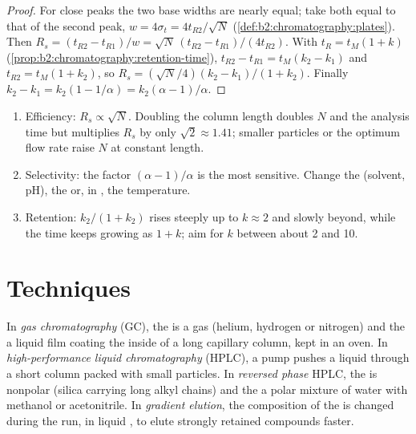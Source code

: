 \begin{proof}
For close peaks the two base widths are nearly equal; take both equal to that of the second peak,
$w = 4\sigma_t = 4t_{R2}/\sqrt N$ (\cref{def:b2:chromatography:plates}). Then $R_s = (t_{R2} -
t_{R1})/w = \sqrt N\,(t_{R2} - t_{R1})/(4t_{R2})$. With $t_R = t_M(1 + k)$
(\cref{prop:b2:chromatography:retention-time}), $t_{R2} - t_{R1} = t_M(k_2 - k_1)$ and $t_{R2} =
t_M(1 + k_2)$, so $R_s = (\sqrt N/4)(k_2 - k_1)/(1 + k_2)$. Finally $k_2 - k_1 = k_2(1 - 1/\alpha) =
k_2(\alpha - 1)/\alpha$.
\end{proof}

\begin{method}\label{met:b2:chromatography:improve-resolution}
\begin{enumerate}
  \item Efficiency: $R_s \propto \sqrt N$. Doubling the column length doubles $N$ and the analysis time
        but multiplies $R_s$ by only $\sqrt2 \approx 1.41$; smaller particles or the optimum flow rate
        raise $N$ at constant length.
  \item Selectivity: the factor $(\alpha - 1)/\alpha$ is the most sensitive. Change the 
        (solvent, pH), the  or, in , the temperature.
  \item Retention: $k_2/(1+k_2)$ rises steeply up to $k \approx 2$ and slowly beyond, while the time
        keeps growing as $1 + k$; aim for $k$ between about 2 and 10.
\end{enumerate}
\end{method}

\section{Techniques}

\begin{definition}\label{def:b2:chromatography:techniques}
In \emph{gas chromatography} (GC), the  is a gas (helium, hydrogen
or nitrogen) and the  a liquid film coating the inside of a long capillary column, kept
in an oven. In \emph{high-performance liquid chromatography} (HPLC), a pump pushes a liquid  through a short column packed with small
particles. In \emph{reversed phase} HPLC, the  is nonpolar
(silica carrying long alkyl chains) and the  a polar mixture of water with methanol or
acetonitrile. In \emph{gradient elution}, the composition of the  is
changed during the run, in liquid , to elute strongly retained compounds faster.
\end{definition}

